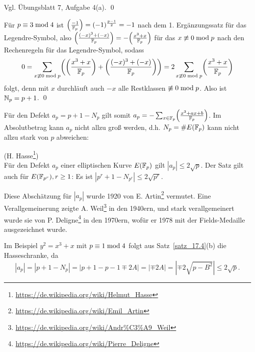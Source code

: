 	Vgl. Übungsblatt 7, Aufgabe 4(a). \qed
	
\begin{bew}
	Für $p \equiv 3 \bmod 4$ ist $\left(\frac{-1}{\mathbb{F}_p}\right) = (-1)^\frac{p-1}{2} = -1$ nach dem 1. Ergänzungssatz für das Legendre-Symbol, also $\leg{(-x)^3+(-x)}{\FF_p} = -\leg{x^3+x}{\FF_p}$ für das $x \not\equiv 0 \bmod p$ nach den Rechenregeln für das Legendre-Symbol, sodass
	\[
		0 = \sum_{x \not\kon 0 \modu p} \enb{ \leg{x^3+x}{\FF_p} + \leg{(-x)^3+(-x)}{\FF_p}} = 2 \sum_{x \not\kon 0 \modu p} \leg{x^3 + x}{\FF_p}
	\]
	folgt, denn mit $x$ durchläuft auch $-x$ alle Restklassen $\not\equiv 0 \bmod p$.
	Also ist $\mathbb{N}_p = p+1$. \qed
\end{bew}

\begin{bem}
	Für den Defekt $a_p = p+1-N_p$ gilt somit $a_p = - \sum_{x \in \FF_p} \leg{x^3+ax+b}{\FF_p}$.
	Im Absolutbetrag kann $a_p$ nicht allzu groß werden, d.h. $N_p = \#E(\mathbb{F}_p)$ kann nicht allzu stark von $p$ abweichen:
\end{bem}

\begin{satz}
	(H. Hasse\footnote{\url{https://de.wikipedia.org/wiki/Helmut_Hasse}}) \\
	Für den Defekt $a_p$ einer elliptischen Kurve $E(\mathbb{F}_p)$ gilt $|a_p| \leq 2 \sqrt{p}$.
	Der Satz gilt auch für $E(\mathbb{F}_{p^r}), r \geq 1$: Es ist $|p^r + 1 - N_{p^r}| \leq 2 \sqrt{p^r}$.
\end{satz}

\begin{bem}
	Diese Abschätzung für $|a_p|$ wurde 1920 von E. Artin\footnote{\url{https://de.wikipedia.org/wiki/Emil_Artin}} vermutet.
	Eine Verallgemeinerung zeigte A. Weil\footnote{\url{https://de.wikipedia.org/wiki/Andr\%C3\%A9_Weil}} in den 1940ern, und stark verallgemeinert wurde sie von P. Deligne\footnote{\url{https://de.wikipedia.org/wiki/Pierre_Deligne}} in den 1970ern, wofür er 1978 mit der Fields-Medaille ausgezeichnet wurde.
\end{bem}

\begin{bem}
	Im Beispiel $y^2 = x^3 + x$ mit $p \equiv 1 \bmod 4$ folgt aus Satz~\ref{satz_17.4}(b) die Hasseschranke, da
	\[
		|a_p| = |p+1-N_p| = |p+1-p-1 \mp 2A| = |\mp 2A| = |\mp 2 \sqrt{p-B^2}| \leq 2 \sqrt{p}.
	\]
\end{bem}

